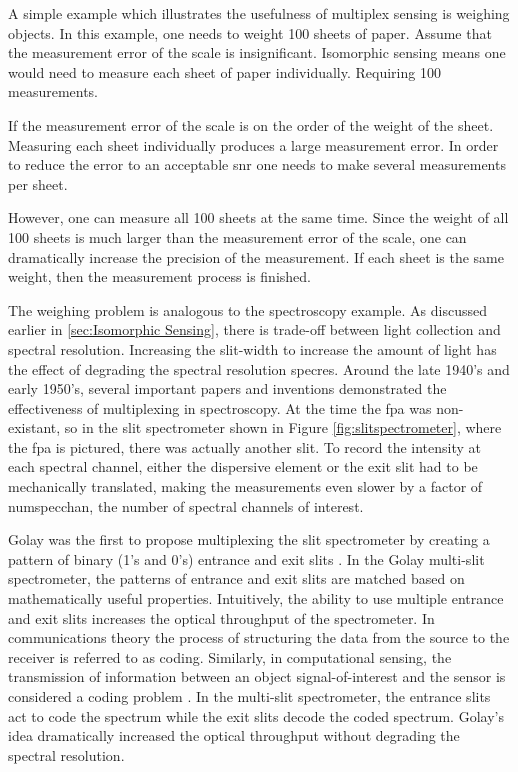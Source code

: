 A simple example which illustrates the usefulness of multiplex sensing is weighing objects. In this example, one needs to weight 100 sheets of paper. Assume that the measurement error of the scale is insignificant. Isomorphic sensing means one would need to measure each sheet of paper individually. Requiring 100 measurements. 

If the measurement error of the scale is on the order of the weight of the sheet. Measuring each sheet individually produces a large measurement error. In order to reduce the error to an acceptable \gls{snr} one needs to make several measurements per sheet.

However, one can measure all 100 sheets at the same time. Since the weight of all 100 sheets is much larger than the measurement error of the scale, one can dramatically increase the precision of the measurement. If each sheet is the same weight, then the measurement process is finished.

The weighing problem is analogous to the spectroscopy example. As discussed earlier in \autoref{sec:Isomorphic Sensing}, there is trade-off between light collection and spectral resolution. Increasing the slit-width to increase the amount of light has the effect of degrading the spectral resolution \gls{specres}. Around the late 1940's and early 1950's, several important papers and inventions demonstrated the effectiveness of multiplexing in spectroscopy. At the time the \gls{fpa} was non-existant, so in the slit spectrometer shown in Figure \ref{fig:slitspectrometer}, where the \gls{fpa} is pictured, there was actually another slit. To record the intensity at each spectral channel, either the dispersive element or the exit slit had to be mechanically translated, making the measurements even slower by a factor of \gls{numspecchan}, the number of spectral channels of interest. 

Golay was the first to propose multiplexing the slit spectrometer by creating a pattern of binary (1's and 0's) entrance and exit slits \cite{golay1949multi}. In the Golay multi-slit spectrometer, the patterns of entrance and exit slits are matched based on mathematically useful properties. Intuitively, the ability to use multiple entrance and exit slits increases the optical throughput of the spectrometer. In communications theory the process of structuring the data from the source to the receiver is referred to as \gls{coding}. Similarly, in computational sensing, the transmission of information between an object signal-of-interest and the sensor is considered a coding problem \cite{brady2009optical}. In the multi-slit spectrometer, the entrance slits act to code the spectrum while the exit slits decode the coded spectrum. Golay's idea dramatically increased the optical throughput without degrading the spectral resolution. 

